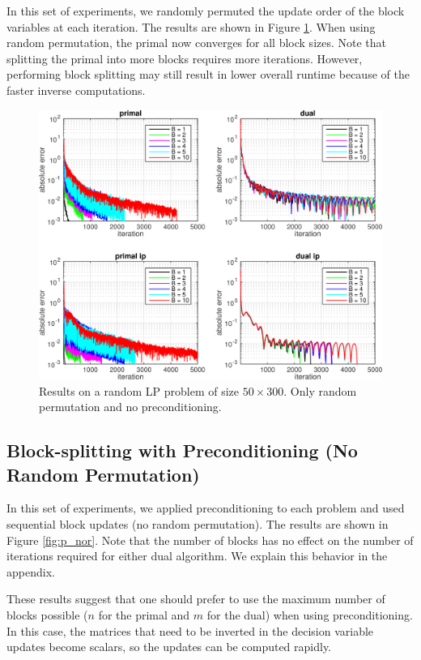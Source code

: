 \documentclass{article}
\begin{document}
In this set of experiments, we randomly permuted the update order of the block variables at each iteration. The results are shown in Figure \ref{fig:nop_r}. When using random permutation, the primal now converges for all block sizes. Note that splitting the primal into more blocks requires more iterations. However, performing block splitting may still result in lower overall runtime because of the faster inverse computations. 

\begin{figure}[h]
	\includegraphics[width=\textwidth]{../figures/noprecond_rndperm.png}
	\caption{Results on a random LP problem of size $50 \times 300$. Only random permutation and no preconditioning.}
	\label{fig:nop_r}
\end{figure}

\subsection*{Block-splitting with Preconditioning (No Random Permutation)}
In this set of experiments, we applied preconditioning to each problem and used sequential block updates (no random permutation). The results are shown in Figure \ref{fig:p_nor}. Note that the number of blocks has no effect on the number of iterations required for either dual algorithm. We explain this behavior in the appendix. 

These results suggest that one should prefer to use the maximum number of blocks possible ($n$ for the primal and $m$ for the dual) when using preconditioning. In this case, the matrices that need to be inverted in the decision variable updates become scalars, so the updates can be computed rapidly.
\end{document}
